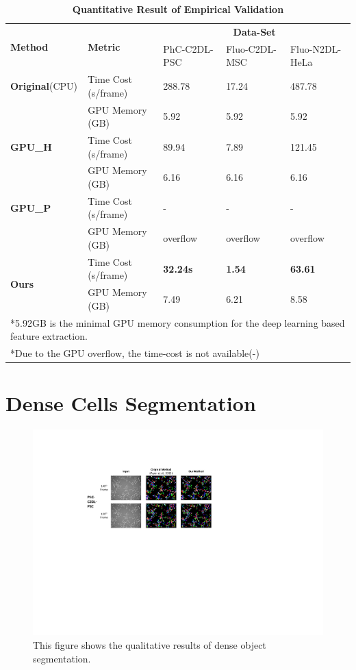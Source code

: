 \documentclass[journal,twoside,web]{ieeecolor}
\begin{document}
\begin{table}[h]
\caption{\textbf{Quantitative Result of Empirical Validation}}
\setlength{\tabcolsep}{3pt}
\renewcommand\arraystretch{1.3}
\centering
\begin{tabular}{p{3.5cm}<{\centering} | p{3.5cm}<{\centering} | p{3cm}<{\centering} p{3cm}<{\centering}  p{3cm}<{\centering} }
\hline
\hline
\multirow{2}{*}{\textbf{Method}} & \multirow{2}{*}{\textbf{Metric}} & \multicolumn{3}{c}{\textbf{Data-Set}}\\
\cline{3-5}
& & PhC-C2DL-PSC & Fluo-C2DL-MSC & Fluo-N2DL-HeLa \\
\hline
\textbf{Original}(CPU) & Time Cost (s/frame) & 288.78 & 17.24 & 487.78 \\
~\cite{b15,b33} & GPU Memory (GB) & 5.92 & 5.92 & 5.92 \\
\hline
\textbf{GPU\_H} & Time Cost (s/frame) &  89.94 &  7.89 &  121.45 \\
~\cite{b19} & GPU Memory (GB) & 6.16 & 6.16 & 6.16  \\
\hline
\textbf{GPU\_P} & Time Cost (s/frame) & - & - & - \\
~\cite{b18} & GPU Memory (GB) &  overflow &  overflow &  overflow \\
\hline
\multirow{2}{*}{\textbf{Ours}} & Time Cost (s/frame) &  \textbf{32.24s} & \textbf{1.54} & \textbf{63.61} \\
 & GPU Memory (GB) &  7.49 & 6.21 &  8.58 \\
\hline
\hline
\multicolumn{5}{l}{*5.92GB is the minimal GPU memory consumption for the deep learning based feature extraction. }\\
\multicolumn{5}{l}{*Due to the GPU overflow, the time-cost is not available(-)}
\end{tabular}
\label{tabap1}
\end{table}

\newpage
\section{Dense Cells Segmentation}
\begin{figure}[h]
\includegraphics[width=6.5 in]{ap3.pdf}
\caption{This figure shows the qualitative results of dense object segmentation. }
\label{figap3}
\end{figure}
\end{document}
